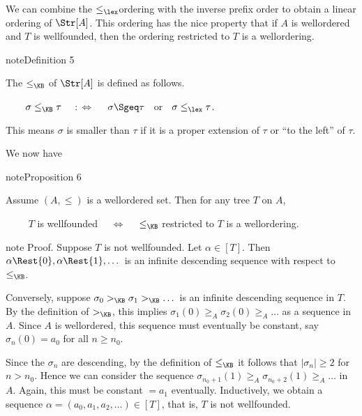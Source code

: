 \documentclass[letterpaper,10pt,english]{jupyterBook}
\begin{document}
\sphinxAtStartPar
We can combine the \(\leq_{\lex}\)\sphinxhyphen{}ordering with the inverse prefix order to obtain a linear ordering of \(\Str[A]\). This ordering has the nice property that if \(A\) is well\sphinxhyphen{}ordered and \(T\) is well\sphinxhyphen{}founded, then the ordering restricted to \(T\) is a well\sphinxhyphen{}ordering.
\label{trees:def-Kleene-Brouwer}
\begin{sphinxadmonition}{note}{Definition 5}



\sphinxAtStartPar
The  \(\leq_{\KB}\) of \(\Str[A]\) is defined as follows.

\sphinxAtStartPar
\(\qquad \sigma \leq_{\KB} \tau\) \(\quad :\Leftrightarrow \quad\)  \(\sigma \Sgeq \tau \;\;\)  or \(\; \; \sigma \leq_{\lex} \tau\).
\end{sphinxadmonition}

\sphinxAtStartPar
This means \(\sigma\) is smaller than \(\tau\) if it is a proper extension of \(\tau\) or “to the left” of \(\tau\).

\sphinxAtStartPar
We now have
\label{trees:prop-KB-wellorder}
\begin{sphinxadmonition}{note}{Proposition 6}



\sphinxAtStartPar
Assume \((A,\leq)\) is a well\sphinxhyphen{}ordered set. Then for any tree \(T\) on \(A\),

\sphinxAtStartPar
\(\qquad\) \(T\) is well\sphinxhyphen{}founded \(\quad \Leftrightarrow \quad\)  \(\leq_{\KB}\) restricted to \(T\) is a well\sphinxhyphen{}ordering.
\end{sphinxadmonition}

\begin{sphinxadmonition}{note}
\sphinxAtStartPar
Proof. Suppose \(T\) is not well\sphinxhyphen{}founded. Let \(\alpha \in [T]\). Then \(\alpha\Rest{0}, \alpha\Rest{1}, \dots\) is an infinite descending sequence with respect to \(\leq_{\KB}\).

\sphinxAtStartPar
Conversely, suppose \(\sigma_0 >_{\KB} \sigma_1 >_{\KB} \dots\) is an infinite descending sequence in \(T\). By the definition of \(>_{\KB}\), this implies \(\sigma_1(0) \geq_A \sigma_2(0) \geq_A \dots\) as a sequence in \(A\). Since \(A\) is well\sphinxhyphen{}ordered, this sequence must eventually be constant, say \(\sigma_n(0) = a_0\) for all \(n \geq n_0\).

\sphinxAtStartPar
Since the \(\sigma_n\) are descending, by the definition of \(\leq_{\KB}\) it follows that \(|\sigma_n| \geq 2\) for \(n > n_0\). Hence we can consider the sequence \(\sigma_{n_0+1}(1) \geq_A \sigma_{n_0+2}(1) \geq_A  \dots\) in \(A\). Again, this must be constant \(= a_1\) eventually. Inductively, we obtain a sequence \(\alpha = (a_0, a_1, a_2, \dots) \in [T]\), that is, \(T\) is not well\sphinxhyphen{}founded.
\end{sphinxadmonition}
\end{document}
